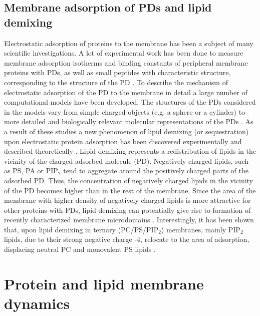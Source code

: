 \subsection{Membrane adsorption of PDs and lipid demixing}

\label{adsorption_introduction}

Electrostatic adsorption of proteins to the membrane has been a subject of many scientific investigations. A lot of experimental work has been done to \mbox{measure} membrane adsorption isotherms and binding constants of peripheral membrane proteins with PDs, as well as small peptides with characteristic structure, corresponding to the structure of the PD \cite{Heimburg1999,Murray1998,Denisov1998,Ben-Tal1996}. To describe the mechanism of electrostatic adsorption of the PD to the membrane in detail a large number of computational models have been developed. The structures of the PDs considered in the models vary from simple charged objects (e.g. a sphere or a cylinder) \cite{Tzlil2005, Mbamala2005, Heimburg1999} to more detailed and biologically relevant molecular representations of the PDs \cite{Denisov1998,Ben-Tal1996,Murray1998,Tzlil2008}. As a result of these studies a new phenomenon of lipid demixing (or sequestration) upon electrostatic protein adsorption has been discovered experimentally and described theoretically \cite{Heimburg1999,Wang2002,Golebiewska2006,Gambhir2004,Wang2004,May2000,Haleva2004}. Lipid demixing represents a redistribution of lipids in the vicinity of the charged adsorbed molecule (PD). Negatively charged lipids, such as PS, PA or PIP$_2$ tend to aggregate around the positively charged parts of the adsorbed PD. Thus, the \mbox{concentration} of negatively charged lipids in the vicinity of the PD becomes higher than in the rest of the membrane. Since the area of the membrane with higher density of negatively charged lipids is more attractive for other proteins with PDs, lipid demixing can potentially give rise \cite{Denisov1998,May2000,Mbamala2005} to formation of recently characterized membrane microdomains \cite{Day2009,Goryachev2008}. Interestingly, it has been shown that, upon lipid demixing in ternary (PC/PS/PIP$_2$) membranes, mainly PIP$_2$ lipids, due to their strong negative charge -4, relocate to the area of adsorption, displacing neutral PC and monovalent PS lipids \cite{Wang2002,Golebiewska2006,Gambhir2004,Wang2004,Haleva2004}.

\section{Protein and lipid membrane dynamics}

